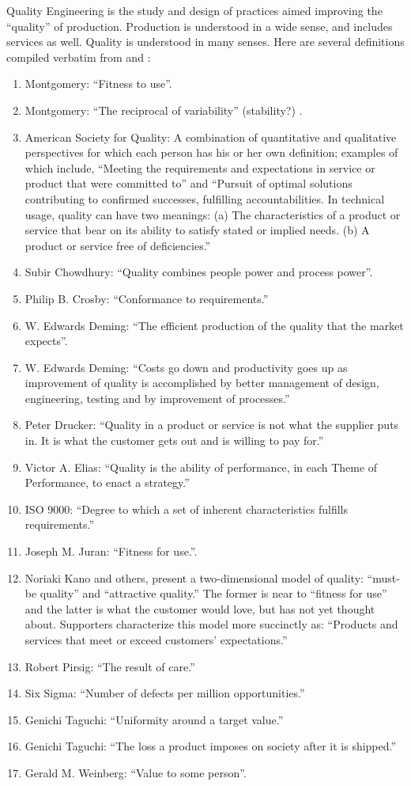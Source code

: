 \documentclass[12pt,a4paper]{report}
\begin{document}
Quality Engineering is the study and design of practices aimed improving the ``quality'' of production. 
Production is understood in a wide sense, and includes services as well.
Quality is understood in many senses. Here are several definitions compiled verbatim from \cite{montgomery_introduction_2007}  and \cite{wikipedia_quality_2015}:
\begin{enumerate}
\item Montgomery: ``Fitness to use''.
\item Montgomery: ``The reciprocal of variability'' (stability?) .
\item American Society for Quality:
A combination of quantitative and qualitative perspectives for which each person has his or her own definition; examples of which include, ``Meeting the requirements and expectations in service or product that were committed to'' and ``Pursuit of optimal solutions contributing to confirmed successes, fulfilling accountabilities.
 In technical usage, quality can have two meanings: 
 (a) The characteristics of a product or service that bear on its ability to satisfy stated or implied needs. 
 (b) A product or service free of deficiencies.''
\item Subir Chowdhury: 
``Quality combines people power and process power''.
\item Philip B. Crosby: 
``Conformance to requirements.''
\item  W. Edwards Deming:
``The efficient production of the quality that the market expects''.
\item W. Edwards Deming: 
``Costs go down and productivity goes up as improvement of quality is accomplished by better management of design, engineering, testing and by improvement of processes.''
\item Peter Drucker: 
``Quality in a product or service is not what the supplier puts in. It is what the customer gets out and is willing to pay for.''
\item Victor A. Elias: 
``Quality is the ability of performance, in each Theme of Performance, to enact a strategy.''
\item ISO 9000: 
``Degree to which a set of inherent characteristics fulfills requirements.'' 
\item Joseph M. Juran: 
``Fitness for use.''. 
\item Noriaki Kano and others, present a two-dimensional model of quality: ``must-be quality'' and ``attractive quality.'' The former is near to ``fitness for use'' and the latter is what the customer would love, but has not yet thought about. Supporters characterize this model more succinctly as: ``Products and services that meet or exceed customers' expectations.''
\item Robert Pirsig: ``The result of care.''
\item Six Sigma: ``Number of defects per million opportunities.''
\item Genichi Taguchi:
``Uniformity around a target value.''
\item Genichi Taguchi:
``The loss a product imposes on society after it is shipped.''
\item Gerald M. Weinberg: ``Value to some person''.
\end{enumerate}
\end{document}

